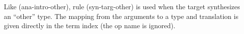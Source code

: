 \documentclass[10pt,preprint]{sigplanconf}
\newtheorem{lemma}{Lemma}
\newtheorem{definition}{Definition}
\begin{document}
Like (ana-intro-other), rule (syn-targ-other) is used when the target synthesizes an ``other'' type. The mapping from the arguments to a type and translation is given directly in the term index (the op name is ignored).






\end{document}
